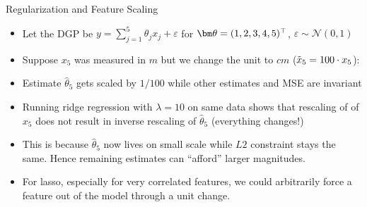 \documentclass[11pt,compress,t,notes=noshow, xcolor=table]{beamer}
\begin{document}
\begin{vbframe}{Regularization and Feature Scaling}
\footnotesize{
\begin{itemize}
    \item Let the DGP be $y = \sum_{j=1}^{5} \theta_j x_{j} +\varepsilon$ for $\thetav=(1,2,3,4,5)^\top$, $\varepsilon \sim \mathcal{N}(0,1)$ %
    \item Suppose $x_5$ was measured in $m$ but we change the unit to $cm$ ($\Tilde{x}_5=100 \cdot x_5$):
\end{itemize}
\vspace{-0.4cm}
\begin{table}[h]
\centering

\end{table}
\vspace{-0.1cm}
\begin{itemize}
    \item Estimate $\hat{\theta}_5$ gets scaled by $1/100$ while other estimates and MSE are invariant
    \item Running ridge regression with $\lambda=10$ on same data shows that rescaling of of $x_5$ does not result in inverse rescaling of $\hat{\theta}_5$ (everything changes!)
    \item This is because $\hat{\theta}_5$ now lives on small scale while $L2$ constraint stays the same. Hence remaining estimates can ``afford'' larger magnitudes.
\end{itemize}
\vspace{-0.4cm}
\begin{table}[h]
\centering

\end{table}
}

\begin{itemize}
    \item For lasso, especially for very correlated features, we could arbitrarily force a feature out of the model through a unit change.
\end{itemize}

\framebreak



\end{vbframe}
\end{document}
